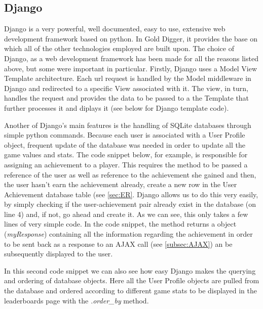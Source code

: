 \documentclass{mproj}
\begin{document}
\subsection{Django}
Django is a very powerful, well documented, easy to use, extensive web development framework based on python. In Gold Digger, it provides the base on which all of the other technologies employed are built upon. The choice of Django, as a web development framework has been made for all the reasons listed above, but some were important in particular. Firstly, Django uses a Model View Template architecture. Each url request is handled by the Model middleware in Django and redirected to a specific View associated with it. The view, in turn, handles the request and provides the data to be passed to a the Template that further processes it and diplays it (see below for Django template code).

 Another of Django's main features is the handling of SQLite databases through simple python commands. Because each user is associated with a User Profile object, frequent update of the database was needed in order to update all the game values and stats. The code snippet below, for example, is responsible for assigning an achievement to a player. This requires the method to be passed a reference of the user as well as reference to the achievement she gained and then, the user hasn't earn the achievement already, create a new row in the User Achievement database table (see \ref{sec:ER}. Django allows us to do this very easily, by simply checking if the user-achievement pair already exist in the database (on line 4) and, if not, go ahead and create it. As we can see, this only takes a few lines of very simple code. In the code snippet, the method returns a object (\emph{myResponse}) containing all the information regarding the achievement in order to be sent back as a response to an AJAX call (see \ref{subsec:AJAX}) an be subsequently displayed to the user. 



In this second code snippet we can also see how easy Django makes the querying and ordering of database objects. Here all the User Profile objects are pulled from the database and ordered according to different game stats to be displayed in the leaderboards page with the \textit{.order\_by} method.


\end{document}
